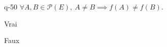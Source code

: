 \begin{truefalse}{q-50}
$\forall A, B\in \mathcal{P}(E),\ A\neq B \implies f(A)\neq f(B)$.
\item Vrai
\item* Faux
\end{truefalse}


